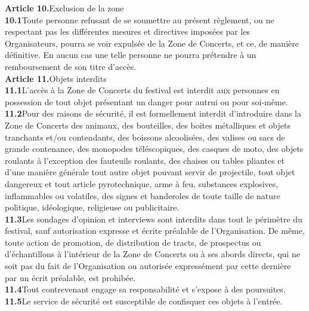 \documentclass[hidelinks, paper=a4, fontsize=13pt]{report}
\begin{document}
\textbf{Article 10.}\hspace{3mm}Exclusion de la zone\\
\textbf{10.1}\hspace{3mm}Toute personne refusant de se soumettre au présent règlement, ou ne respectant pas les différentes mesures et directives imposées par les Organisateurs, pourra se voir expulsée de la Zone de Concerts, et ce, de manière définitive. En aucun cas une telle personne ne pourra prétendre à un remboursement de son titre d’accès. \\


\textbf{Article 11.}\hspace{3mm}Objets interdits\\
\textbf{11.1}\hspace{3mm}L’accès à la Zone de Concerts du festival est interdit aux personnes en possession de tout objet présentant un danger pour autrui ou pour soi-même.\\
\textbf{11.2}\hspace{3mm}Pour des raisons de sécurité, il est formellement interdit d'introduire dans la Zone de Concerts des animaux, des bouteilles, des boites métalliques et objets tranchants et/ou contendants, des boissons alcoolisées, des valises ou sacs de grande contenance, des monopodes téléscopiques, des casques de moto, des objets roulants à l'exception des fauteuils roulants, des chaises ou tables pliantes et d'une manière générale tout autre objet pouvant servir de projectile, tout objet dangereux et tout article pyrotechnique, arme à feu, substances explosives, inflammables ou volatiles, des signes et banderoles de toute taille de nature politique, idéologique, religieuse ou publicitaire.\\
\textbf{11.3}\hspace{3mm}Les sondages d'opinion et interviews sont interdits dans tout le périmètre du festival, sauf autorisation expresse et écrite préalable de l'Organisation. De même, toute action de promotion, de distribution de tracts, de prospectus ou d'échantillons à l'intérieur de la Zone de Concerts ou à ses abords directs, qui ne soit pas du fait de l'Organisation ou autorisée expressément par cette dernière par un écrit préalable, est prohibée.\\
\textbf{11.4}\hspace{3mm}Tout contrevenant engage sa responsabilité et s'expose à des poursuites.\\
\textbf{11.5}\hspace{3mm}Le service de sécurité est susceptible de confisquer ces objets à l’entrée.\\
\end{document}
